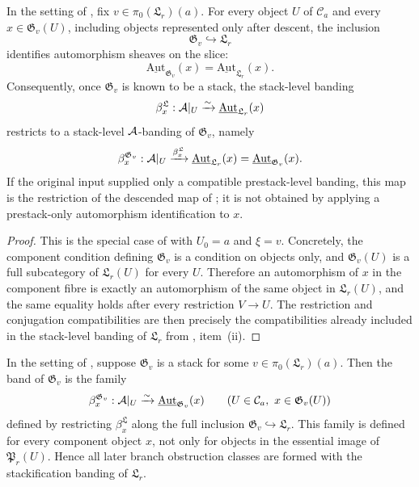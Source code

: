 \begin{lemma}\label{lem:component-inherits-stack-band}
In the setting of , fix
$v\in\pi_0(\mathfrak L_r)(a)$. For every object $U$ of $\mathcal C_a$ and every
$x\in\mathfrak G_v(U)$, including objects represented only after descent, the
inclusion
\[
\mathfrak G_v\hookrightarrow \mathfrak L_r
\]
identifies automorphism sheaves on the slice:
\[
\underline{\mathrm{Aut}}_{\mathfrak G_v}(x)
=
\underline{\mathrm{Aut}}_{\mathfrak L_r}(x).
\]
Consequently, once $\mathfrak G_v$ is known to be a stack, the stack-level
banding
\[
\beta^{\mathfrak L}_x:\mathcal{A}|_U\xrightarrow{\sim}
\underline{\mathrm{Aut}}_{\mathfrak L_r}(x)
\]
restricts to a stack-level $\mathcal{A}$-banding of $\mathfrak G_v$, namely
\[
\beta^{\mathfrak G_v}_x:\mathcal{A}|_U
\xrightarrow{\beta^{\mathfrak L}_x}
\underline{\mathrm{Aut}}_{\mathfrak L_r}(x)
=
\underline{\mathrm{Aut}}_{\mathfrak G_v}(x).
\]
If the original input supplied only a compatible prestack-level banding, this
map is the restriction of the descended map of
; it is not obtained by applying a
prestack-only automorphism identification to $x$.
\end{lemma}

\begin{proof}
This is the special case of  with
$U_0=a$ and $\xi=v$. Concretely, the component condition defining
$\mathfrak G_v$ is a condition on objects only, and $\mathfrak G_v(U)$ is a full
subcategory of $\mathfrak L_r(U)$ for every $U$. Therefore an automorphism of
$x$ in the component fibre is exactly an automorphism of the same object in
$\mathfrak L_r(U)$, and the same equality holds after every restriction
$V\to U$. The restriction and conjugation compatibilities are then precisely the
compatibilities already included in the stack-level banding of $\mathfrak L_r$
from , item~\textup{(ii)}.
\end{proof}

\begin{proposition}\label{prop:component-bands-are-stackification-bands}
In the setting of , suppose
$\mathfrak G_v$ is a stack for some
$v\in\pi_0(\mathfrak L_r)(a)$. Then the band of $\mathfrak G_v$ is the family
\[
\beta^{\mathfrak G_v}_x:\mathcal{A}|_U\xrightarrow{\sim}
\underline{\mathrm{Aut}}_{\mathfrak G_v}(x)
\qquad (U\in\mathcal C_a,\ x\in\mathfrak G_v(U))
\]
defined by restricting $\beta^{\mathfrak L}_x$ along the full inclusion
$\mathfrak G_v\hookrightarrow\mathfrak L_r$. This family is defined for every
component object $x$, not only for objects in the essential image of
$\mathfrak P_r(U)$. Hence all later branch obstruction classes are formed with
the stackification banding of $\mathfrak L_r$.
\end{proposition}

